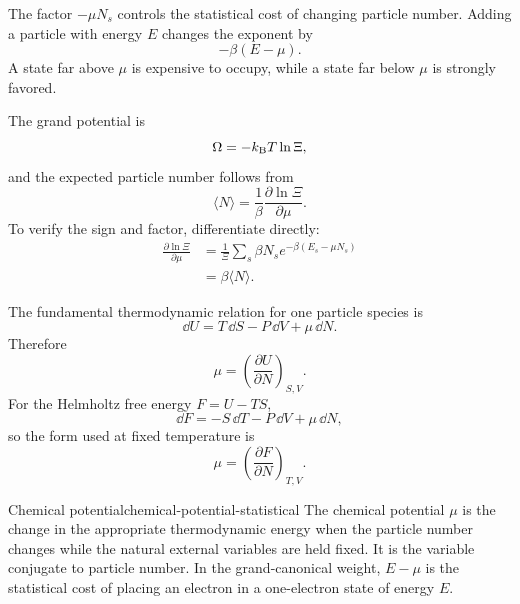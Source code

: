 The factor $-\mu N_s$ controls the statistical cost of changing particle
number.  Adding a particle with energy $E$ changes the exponent by
\begin{equation}
  -\beta(E-\mu).
  \label{eq:add-particle-grand-energy}
\end{equation}
A state far above $\mu$ is expensive to occupy, while a state far below $\mu$
is strongly favored.

The grand potential is
\begin{equation}
  \Omega=-k_{\mathrm B} T\ln\Xi,
  \label{eq:grand-potential}
\end{equation}
and the expected particle number follows from
\begin{equation}
  \boxed{
  \langle N\rangle
  =\frac{1}{\beta}
   \frac{\partial\ln\Xi}{\partial\mu}.
  }
  \label{eq:particle-number-from-grand-partition}
\end{equation}
To verify the sign and factor, differentiate directly:
\begin{equation}
\begin{aligned}
  \frac{\partial\ln\Xi}{\partial\mu}
  &=\frac{1}{\Xi}
    \sum_s\beta N_s e^{-\beta(E_s-\mu N_s)}\\
  &=\beta\langle N\rangle.
\end{aligned}
  \label{eq:grand-particle-derivative}
\end{equation}

The fundamental thermodynamic relation for one particle species is
\begin{equation}
  \dd U=T\,\dd S-P\,\dd V+\mu\,\dd N.
  \label{eq:fundamental-relation-with-chemical-potential}
\end{equation}
Therefore
\begin{equation}
  \mu
  =\left(\frac{\partial U}{\partial N}\right)_{S,V}.
  \label{eq:chemical-potential-internal-energy-derivative}
\end{equation}
For the Helmholtz free energy $F=U-TS$,
\begin{equation}
  \dd F=-S\,\dd T-P\,\dd V+\mu\,\dd N,
  \label{eq:helmholtz-differential-chemical-potential}
\end{equation}
so the form used at fixed temperature is
\begin{equation}
  \boxed{
  \mu
  =\left(\frac{\partial F}{\partial N}\right)_{T,V}.
  }
  \label{eq:chemical-potential-free-energy-derivative}
\end{equation}

\begin{definition}{Chemical potential}{chemical-potential-statistical}
The chemical potential $\mu$ is the change in the appropriate thermodynamic
energy when the particle number changes while the natural external variables
are held fixed.  It is the variable conjugate to particle number.  In the
grand-canonical weight, $E-\mu$ is the statistical cost of placing an electron
in a one-electron state of energy $E$.
\end{definition}

